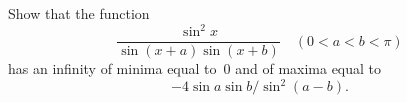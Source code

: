 Show that the function
\[
\frac{\sin^{2}x}{\sin(x + a)\sin(x + b)}\quad
(0 < a < b < \pi)
\]
has an infinity of minima equal to~$0$ and of maxima equal to
\[
-4\sin a\sin b/\sin^{2}(a - b).
\]

